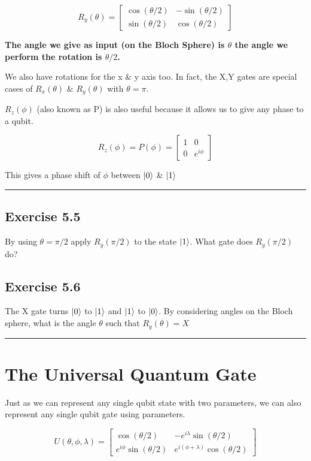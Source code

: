 \documentclass{book}
\begin{document}
$$
R_y(\theta) = \begin{bmatrix} \cos(\theta /2) & -\sin(\theta /2) \\ \sin(\theta /2) & \cos(\theta /2) \end{bmatrix}
$$

\textbf{The angle we give as input (on the Bloch Sphere) is $\theta$ the angle we perform the rotation is $\theta/2$.}

We also have rotations for the x \& y axis too. In fact, the X,Y gates are special cases of $R_x(\theta)$ \& $R_y(\theta)$ with $\theta = \pi$. 

$R_z(\phi)$ (also known as P) is also useful because it allows us to give any phase to a qubit. 

$$
R_z(\phi) = P(\phi) = \begin{bmatrix} 1 & 0 \\ 0 & e^{i\phi} \end{bmatrix}
$$

This gives a phase shift of $\phi$ between $\ket{0}$ \& $\ket{1}$

\hrule
\subsection{Exercise 5.5}
By using $\theta = \pi/2$ apply $R_y(\pi/2)$ to the state $\ket{1}$. What gate does $R_y(\pi/2)$ do? 
 
\subsection{Exercise 5.6} 
The X gate turns $\ket{0}$ to $\ket{1}$ and $\ket{1}$ to $\ket{0}$. By considering angles on the Bloch sphere, what is the angle $\theta$ such that $R_y(\theta) = X$
\hrule

\section{ The Universal Quantum Gate }

Just as we can represent any single qubit state with two parameters, we can also represent any single qubit gate using parameters. 

$$
U(\theta, \phi, \lambda) = \begin{bmatrix} \cos(\theta/2) & -e^{i\lambda}\sin(\theta/2) \\ e^{i\phi}\sin(\theta/2) & e^{i(\phi + \lambda)}\cos(\theta/2) \end{bmatrix} 
$$
\end{document}
